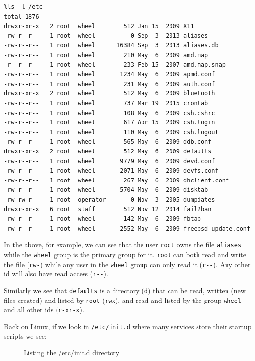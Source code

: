 \documentclass[10pt,]{book}
\numberwithin{figure}{chapter}
\DeclareRobustCommand{\drcap}[1]{\begin{figure}[H]\caption{#1}\end{figure}}
\begin{document}
\begin{verbatim}
%ls -l /etc
total 1876
drwxr-xr-x   2 root  wheel        512 Jan 15  2009 X11
-rw-r--r--   1 root  wheel          0 Sep  3  2013 aliases
-rw-r--r--   1 root  wheel      16384 Sep  3  2013 aliases.db
-rw-r--r--   1 root  wheel        210 May  6  2009 amd.map
-r--r--r--   1 root  wheel        233 Feb 15  2007 amd.map.snap
-rw-r--r--   1 root  wheel       1234 May  6  2009 apmd.conf
-rw-r--r--   1 root  wheel        231 May  6  2009 auth.conf
drwxr-xr-x   2 root  wheel        512 May  6  2009 bluetooth
-rw-r--r--   1 root  wheel        737 Mar 19  2015 crontab
-rw-r--r--   1 root  wheel        108 May  6  2009 csh.cshrc
-rw-r--r--   1 root  wheel        617 Apr 15  2009 csh.login
-rw-r--r--   1 root  wheel        110 May  6  2009 csh.logout
-rw-r--r--   1 root  wheel        565 May  6  2009 ddb.conf
drwxr-xr-x   2 root  wheel        512 May  6  2009 defaults
-rw-r--r--   1 root  wheel       9779 May  6  2009 devd.conf
-rw-r--r--   1 root  wheel       2071 May  6  2009 devfs.conf
-rw-r--r--   1 root  wheel        267 May  6  2009 dhclient.conf
-rw-r--r--   1 root  wheel       5704 May  6  2009 disktab
-rw-rw-r--   1 root  operator       0 Nov  3  2005 dumpdates
drwxr-xr-x   6 root  staff        512 Nov 12  2014 fail2ban
-rw-r--r--   1 root  wheel        142 May  6  2009 fbtab
-rw-r--r--   1 root  wheel       2552 May  6  2009 freebsd-update.conf
\end{verbatim}

In the above, for example, we can see that the user \texttt{root} owns
the file \texttt{aliases} while the \texttt{wheel} group is the primary
group for it. \texttt{root} can both read and write the file
(\texttt{rw-}) while any user in the \texttt{wheel} group can only read
it (\texttt{r-{}-}). Any other id will also have read access
(\texttt{r-{}-}).

Similarly we see that \texttt{defaults} is a directory (\texttt{d}) that
can be read, written (new files created) and listed by \texttt{root}
(\texttt{rwx}), and read and listed by the group \texttt{wheel} and all
other ids (\texttt{r-xr-x}).

Back on Linux, if we look in \texttt{/etc/init.d} where many services
store their startup scripts we see:

\drcap{Listing the /etc/init.d directory}
\end{document}
